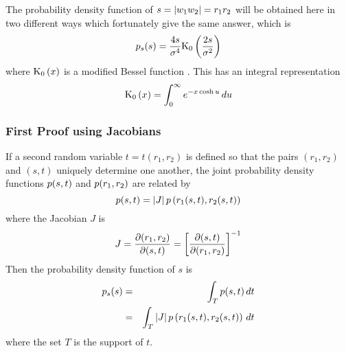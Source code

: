 The probability density function of $s=|{w_1}{w_2}|=r_1r_2$ will be obtained here in two different
ways which fortunately give the same answer, which is
\begin{equation}
{p}_s(s)=\frac{4s}{{\sigma^{4}}}{\mathop{\rm K_0}\nolimits\left(\frac{2s}{{\sigma^2}}\right)}
\end{equation}
where ${\mathop{\rm K_0}\nolimits\left(x\right)}$ is a modified Bessel function \cite[eq. 9.6.24]{Abr65}.
This has an integral representation
\begin{equation}\label{sp app eqn:K0 def}
{\mathop{\rm K_0}\nolimits\left(x\right)}=\int_0^{\infty} {e^{-x\cosh u}}\,du
\end{equation}


\subsubsection{First Proof using Jacobians}

If a second random variable $t=t(r_1,r_2)$ is defined so that the pairs
$(r_1,r_2)$ and $(s,t)$ uniquely determine one another, the joint
probability density functions ${p}(s,t)$ and ${p}(r_1,r_2)$ are related by
\begin{equation}
{p}(s,t)=|J|\,{p}\left(r_1(s,t),r_2(s,t)\right)
\end{equation}
where the Jacobian $J$ is
\begin{equation}
J=\frac{{\partial}(r_1,r_2)}{{\partial}(s,t)}
=\left[\frac{{\partial}(s,t)}{{\partial}(r_1,r_2)}\right]^{-1}
\end{equation}
Then the probability density function of $s$ is
\begin{eqnarray}
{p}_s(s)&=&\int_T {p}(s,t)\,dt {\nonumber}\\
&=&\int_T |J|\,{p}\left(r_1(s,t),r_2(s,t)\right)\,dt\label{sp app eqn:int1}
\end{eqnarray}
where the set $T$ is the support of $t$.

